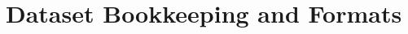 \section{Dataset Bookkeeping and Formats}
\begin{comment}
S. V. Chekanov, G. Gavalian, and N. A. Graf, “Jas4pp - a Data-Analysis Framework for Physics and Detector Studies”, arXiv:2011.05329 [physics.comp-ph ]] (pdf).~\cite{Chekanov:2020bja}
 - Java-based programs make distribution and installation on Windows, Linux, Mac easy
 - They mention excellent library support but it's not clear what libraries?
 - based on JAIDA, the Java implementation of AIDA (Abstract Interfaces for Data Analysis)
 - supports  LCIO [21] I/O library developed for ILC studies. Some examples of reading LCIO files using Jython code can be found in Appendix A.2 (and in the following sections).
 - HiPO (High Performance Output data, from JLAB, has an XROOTD driver)
 - ProMC, ProIO
 - stores outputs with Java serialization method, can be binary format or XML 
 
Jim Pivarski, Eduardo Rodrigues, Kevin Pedro, Oksana Shadura, Benjamin Krikler, Graeme A. Stewart. ”HL-LHC Computing Review Stage 2, Common Software Projects: Data Science Tools for Analysis”, arXiv:2202.02194 [physics.data-an] (pdf).~\cite{arxiv.2202.02194}
- physicists are motivated to contribute
- interoperability is key to supporting scientists
- ROOT is the columnar data store that will always be with us.  But ROOT files might some day contain more than TTrees, in particular RNTuple is under active development
- Apache Arrow, Apache Parquet now offer similary-efficient columnar storage and tese format are used by some collaborations
- Why not databases, this is an obvious match to our access problems!  See Striped, ServiceX, SkyhookDM, Coffea's columnservice, Tiled

J. V. Bennett, J. Guilliams, M. Hernandez Villanueva, D. E. Jaffe, P. J. Laycock, A. Panta, C. Serfon, I. Ueda. ”Belle II grid-based user analysis”, arXiv:2203.07564 [hep-ex] (pdf).~\cite{Bennett:2022gyi}
- ROOT files for storage and analysis
- about 60 PB needed for all data (skimmed and simulation, not saving "original" data?)
- collaboration feels that this is feasible storage-wise (although large) but that 10^12 events represents a data management challenge
  -- Using Rucio for job submission and file resolution
  -- Concerns about scalability
- central question is: how do we fund what's needed for analysis after the experiment?
  -- storage, computing, and networking services all cost money.  In particular, grid solutions require security upkeep and therefore may not be feasible long-term
  -- software must remain usable (perhaps through containers)
  -- float the idea of central facilities that provide needed services to experiments


\end{comment}
